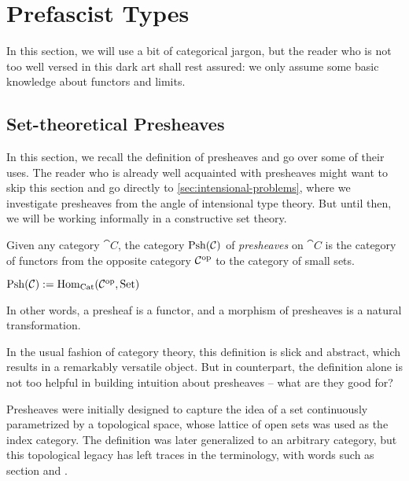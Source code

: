 \setchapterpreamble[u]{\margintoc}
\chapter{Prefascist Types}


In this section, we will use a bit of categorical jargon, but the reader
who is not too well versed in this dark art shall rest assured:
we only assume some basic knowledge about functors and limits.

\section{Set-theoretical Presheaves}\label{sec:categorical-reminders}

In this section, we recall the definition of presheaves and go 
over some of their uses.
% 
The reader who is already well acquainted with presheaves might want to skip
this section and go directly to \cref{sec:intensional-problems}, where we
investigate presheaves from the angle of intensional type theory.
% 
But until then, we will be working informally in a constructive set theory.

Given any category \( \cat{C} \), the category 
\( \catPsh{\cat{C}} \) of \emph{presheaves} on \( \cat{C} \) is the category 
of functors from the opposite category \( \op{\cat{C}} \) to the category of 
small sets.
\begin{definition}
\(
    \catPsh{\cat{C}} := \hom[\catCat]{\op{\cat{C}}}{\catSet}
\)
\end{definition}
In other words, a presheaf is a functor, and a morphism of presheaves is a 
natural transformation.

In the usual fashion of category theory, this definition is slick
and abstract, which results in a remarkably versatile object. 
% 
But in counterpart, the definition alone is not too helpful in building
intuition about presheaves -- what are they good for?

Presheaves were initially designed to capture the 
idea of a set continuously parametrized by a topological space, whose lattice 
of open sets was used as the index category. 
% 
The definition was later generalized to an arbitrary category, but this 
topological legacy has left traces in the terminology, with words such as 
{\color{defcolor} section} and .

